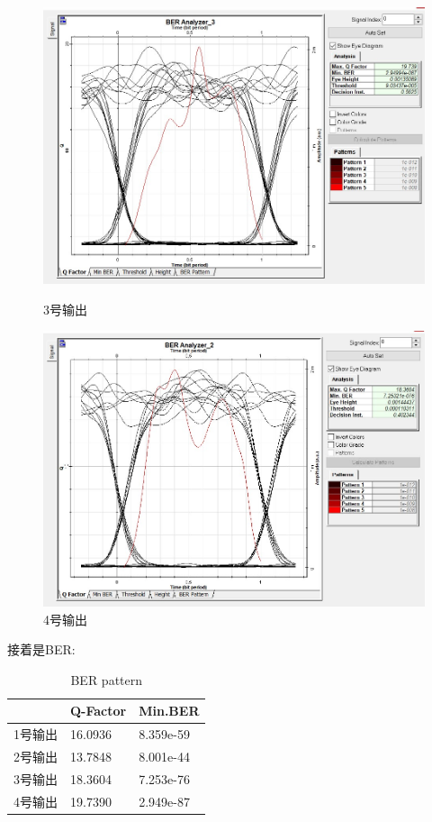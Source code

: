 \documentclass[12pt]{article}
\begin{document}
\begin{figure}[H]
\begin{minipage}[t]{0.5\linewidth}
        \includegraphics[scale=0.5]{Q-factor (3).jpg}
        \caption{3号输出}
        \label{fig:side:a}
      \end{minipage}%
      \begin{minipage}[t]{0.5\linewidth}
        \centering
        \includegraphics[scale=0.5]{Q-factor (4).jpg}
        \caption{4号输出}
        \label{fig:side:b}
      \end{minipage}
\end{figure}
\clearpage
接着是BER:
\begin{table}[H]
  \centering
  \caption{BER pattern}
  \begin{tabular}{|l|l|l|} 
  \hline
    & Q-Factor & Min.BER    \\ 
  \hline
  1号输出 & 16.0936  & 8.359e-59  \\ 
  \hline
  2号输出 & 13.7848  & 8.001e-44  \\ 
  \hline
  3号输出 & 18.3604  & 7.253e-76  \\ 
  \hline
  4号输出 & 19.7390  & 2.949e-87  \\
  \hline
  \end{tabular}
  \end{table}
\end{document}
